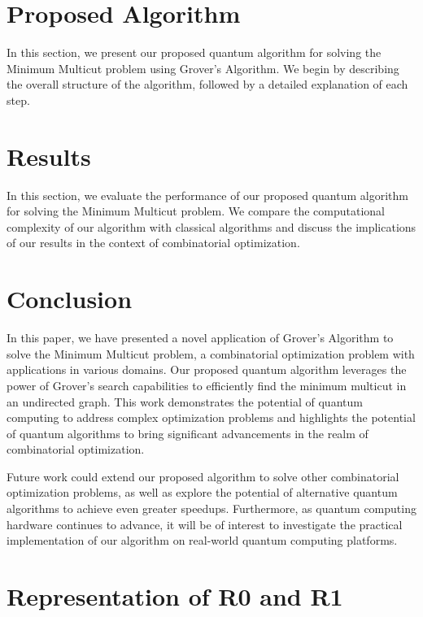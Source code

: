 \section{Proposed Algorithm}\label{sec:proposed_algorithm}

In this section, we present our proposed quantum algorithm for solving the Minimum Multicut problem using Grover's Algorithm. We begin by describing the overall structure of the algorithm, followed by a detailed explanation of each step.

\section{Results}\label{sec:results}

In this section, we evaluate the performance of our proposed quantum algorithm for solving the Minimum Multicut problem. We compare the computational complexity of our algorithm with classical algorithms and discuss the implications of our results in the context of combinatorial optimization.

\section{Conclusion}\label{sec:conclusion}

In this paper, we have presented a novel application of Grover's Algorithm to solve the Minimum Multicut problem, a combinatorial optimization problem with applications in various domains. Our proposed quantum algorithm leverages the power of Grover's search capabilities to efficiently find the minimum multicut in an undirected graph. This work demonstrates the potential of quantum computing to address complex optimization problems and highlights the potential of quantum algorithms to bring significant advancements in the realm of combinatorial optimization.

Future work could extend our proposed algorithm to solve other combinatorial optimization problems, as well as explore the potential of alternative quantum algorithms to achieve even greater speedups. Furthermore, as quantum computing hardware continues to advance, it will be of interest to investigate the practical implementation of our algorithm on real-world quantum computing platforms.



\section{Representation of R0 and R1}

